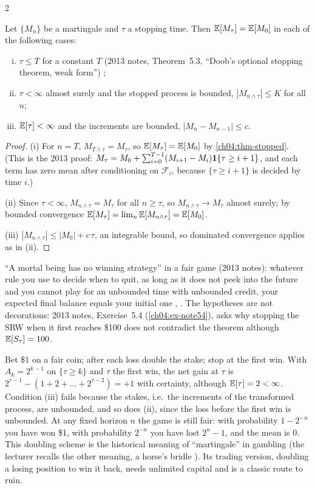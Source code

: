 \begin{paracol}{2}
\begin{theorem}\label{ch04:thm-ost}
Let $\{M_n\}$ be a martingale and $\tau$ a stopping time. Then $\mathbb{E}[M_\tau]=\mathbb{E}[M_0]$ in each of the following
cases:
\begin{enumerate}[(i)]
  \item $\tau\le T$ for a constant $T$ (2013 notes, Theorem~5.3, ``Doob's optional stopping theorem, weak form'')
        ;
  \item $\tau<\infty$ almost surely and the stopped process is bounded, $|M_{n\wedge\tau}|\le K$ for all $n$;
  \item $\mathbb{E}[\tau]<\infty$ and the increments are bounded, $|M_n-M_{n-1}|\le c$.
\end{enumerate}
\end{theorem}
\begin{proof}
(i) For $n=T$, $M_{T\wedge\tau}=M_\tau$, so $\mathbb{E}[M_\tau]=\mathbb{E}[M_0]$ by \cref{ch04:thm-stopped}. (This is the 2013 proof:
$M_\tau=M_0+\sum_{i=0}^{T-1}(M_{i+1}-M_i)\mathbf{1}\{\tau\ge i+1\}$, and each term has zero mean after conditioning on
$\mathcal F_i$, because $\{\tau\ge i+1\}$ is decided by time $i$.)

(ii) Since $\tau<\infty$, $M_{n\wedge\tau}=M_\tau$ for all $n\ge\tau$, so $M_{n\wedge\tau}\to M_\tau$ almost surely; by
bounded convergence $\mathbb{E}[M_\tau]=\lim_n\mathbb{E}[M_{n\wedge\tau}]=\mathbb{E}[M_0]$.

(iii) $|M_{n\wedge\tau}|\le|M_0|+c\,\tau$, an integrable bound, so dominated convergence applies as in (ii).
\end{proof}

``A mortal being has no winning strategy'' in a fair game (2013 notes): whatever rule you use to decide when to
quit, as long as it does not peek into the future and you cannot play for an unbounded time with unbounded credit,
your expected final balance equals your initial one , . The hypotheses are
not decorations: 2013 notes, Exercise~5.4 (\cref{ch04:ex-note54}), asks why stopping the SRW when it first
reaches \$100 does not contradict the theorem although $\mathbb{E}[S_\tau]=100$.

\begin{finance}
Bet \$1 on a fair coin; after each loss double the stake; stop at the first win. With $A_k=2^{k-1}$ on
$\{\tau\ge k\}$ and $\tau$ the first win, the net gain at $\tau$ is $2^{\tau-1}-(1+2+\dots+2^{\tau-2})=+1$ with
certainty, although $\mathbb{E}[\tau]=2<\infty$. Condition (iii) fails because the stakes, i.e.\ the increments of the
transformed process, are unbounded, and so does (ii), since the loss before the first win is unbounded. At any fixed
horizon $n$ the game is still fair: with probability $1-2^{-n}$ you have won \$1, with probability $2^{-n}$ you have lost
$2^n-1$, and the mean is $0$. This doubling scheme is the historical meaning of ``martingale'' in gambling (the
lecturer recalls the other meaning, a horse's bridle ). Its trading version, doubling a losing
position to win it back, needs unlimited capital and is a classic route to ruin.
\end{finance}


\end{paracol}
